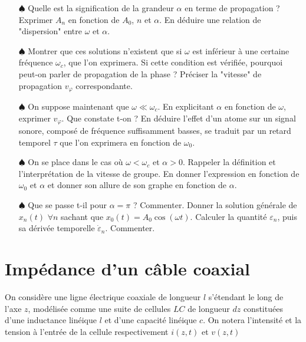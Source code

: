 \documentclass{report}
\begin{document}
\begin{itemize}

	\item[$\spadesuit$] Quelle est la signification de la grandeur $\alpha$ en terme de propagation ? Exprimer $A_n$ en fonction de $A_0$, $n$ et $\alpha$. En déduire une relation de "dispersion" entre $\omega$ et $\alpha$.

	\item[$\spadesuit$] Montrer que ces solutions n'existent que si $\omega$ est inférieur à une certaine fréquence $\omega_c$, que l'on exprimera. Si cette condition est vérifiée, pourquoi peut-on parler de propagation de la phase ? Préciser la "vitesse" de propagation $v_\varphi$ correspondante.
	
	\item[$\spadesuit$] On suppose maintenant que $\omega\ll\omega_c$. En explicitant $\alpha$ en fonction de $\omega$, exprimer $v_\varphi$. Que constate t-on ? En déduire l'effet d'un atome sur un signal sonore, composé de fréquence suffisamment basses, se traduit par un retard temporel $\tau$ que l'on exprimera en fonction de $\omega_0$. 

	\item[$\spadesuit$] On se place dans le cas où $\omega<\omega_c$ et $\alpha>0$. Rappeler la définition et l'interprétation de la vitesse de groupe. En donner l'expression en fonction de $\omega_0$ et $\alpha$ et donner son allure de son graphe en fonction de $\alpha$. 
	
	\item[$\spadesuit$] Que se passe t-il pour $\alpha=\pi$ ? Commenter. Donner la solution générale de $x_n(t)$ $\forall n$ sachant que $x_0(t)=A_0\cos(\omega t)$. Calculer la quantité $\varepsilon_n$, puis sa dérivée temporelle $\dot{\varepsilon}_n$. Commenter.
	
\end{itemize}

\newpage

\section*{Impédance d'un câble coaxial}

On considère une ligne électrique coaxiale de longueur $l$ s'étendant le long de l'axe $z$, modélisée comme une suite de cellules $LC$ de longueur $dz$ constituées d'une inductance linéique $l$ et d'une capacité linéique $c$. On notera l'intensité et la tension à l'entrée de la cellule respectivement $i(z,t)$ et $v(z,t)$
\end{document}
